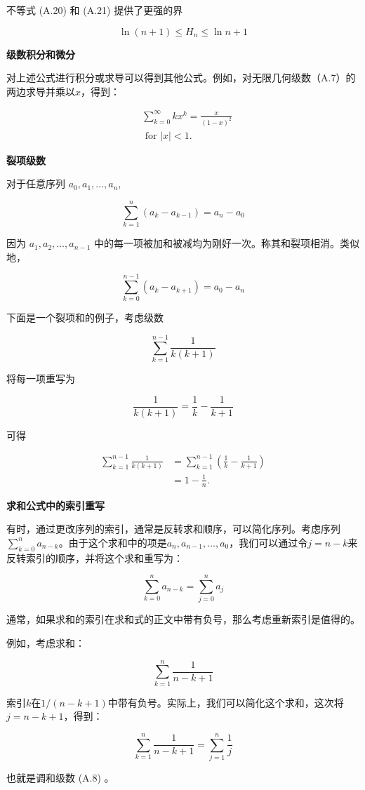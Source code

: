 \documentclass[lang=cn,newtx,10pt,scheme=chinese]{elegantbook}
\begin{document}
不等式 (A.20) 和 (A.21) 提供了更强的界

$$
\ln (n+1) \leq H_n \leq \ln n+1
$$

\textbf{级数积分和微分}

对上述公式进行积分或求导可以得到其他公式。例如，对无限几何级数（A.7）的两边求导并乘以$x$，得到：

$$
\begin{aligned}
& \sum_{k=0}^{\infty} k x^k=\frac{x}{(1-x)^2} \\
& \text { for }|x|<1 .
\end{aligned}
$$

\textbf{裂项级数}

对于任意序列 $a_0, a_1, \ldots, a_n$,

$$
\sum_{k=1}^n(a_k-a_{k-1})=a_n-a_0
$$

因为 $a_1, a_2, \ldots, a_{n-1}$ 中的每一项被加和被减均为刚好一次。称其和裂项相消。类似地，

$$
\sum_{k=0}^{n-1}(a_k-a_{k+1})=a_0-a_n
$$

下面是一个裂项和的例子，考虑级数

$$
\sum_{k=1}^{n-1} \frac{1}{k(k+1)}
$$

将每一项重写为

$$
\frac{1}{k(k+1)}=\frac{1}{k}-\frac{1}{k+1}
$$

可得

$$
\begin{aligned}
\sum_{k=1}^{n-1} \frac{1}{k(k+1)} & =\sum_{k=1}^{n-1}(\frac{1}{k}-\frac{1}{k+1}) \\
& =1-\frac{1}{n} .
\end{aligned}
$$

\textbf{求和公式中的索引重写}

有时，通过更改序列的索引，通常是反转求和顺序，可以简化序列。考虑序列$\sum_{k=0}^n a_{n-k}$。由于这个求和中的项是$a_n, a_{n-1}, \ldots, a_0$，我们可以通过令$j=n-k$来反转索引的顺序，并将这个求和重写为：

$$
\sum_{k=0}^n a_{n-k}=\sum_{j=0}^n a_j
$$

通常，如果求和的索引在求和式的正文中带有负号，那么考虑重新索引是值得的。

例如，考虑求和：

$$
\sum_{k=1}^n \frac{1}{n-k+1}
$$

索引$k$在$1/(n-k+1)$中带有负号。实际上，我们可以简化这个求和，这次将$j=n-k+1$，得到：

$$
\sum_{k=1}^n \frac{1}{n-k+1}=\sum_{j=1}^n \frac{1}{j}
$$

也就是调和级数 (A.8) 。
\end{document}
